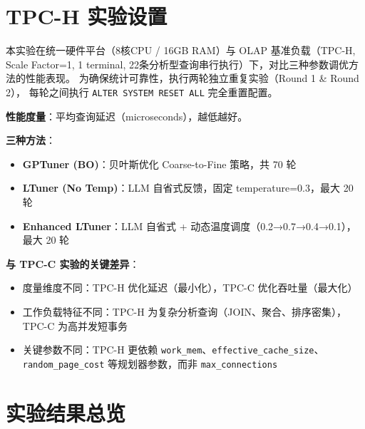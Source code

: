 

\section{TPC-H 实验设置}

本实验在统一硬件平台（8核CPU / 16GB RAM）与 OLAP 基准负载（TPC-H, Scale Factor=1,
1 terminal, 22条分析型查询串行执行）下，对比三种参数调优方法的性能表现。
为确保统计可靠性，执行两轮独立重复实验（Round 1 \& Round 2），
每轮之间执行 \texttt{ALTER SYSTEM RESET ALL} 完全重置配置。

\textbf{性能度量}：平均查询延迟（microseconds），越低越好。

\textbf{三种方法}：
\begin{itemize}
  \item \textbf{GPTuner (BO)}：贝叶斯优化 Coarse-to-Fine 策略，共 70 轮
  \item \textbf{LTuner (No Temp)}：LLM 自省式反馈，固定 temperature=0.3，最大 20 轮
  \item \textbf{Enhanced LTuner}：LLM 自省式 + 动态温度调度（0.2→0.7→0.4→0.1），最大 20 轮
\end{itemize}

\textbf{与 TPC-C 实验的关键差异}：
\begin{itemize}
  \item 度量维度不同：TPC-H 优化延迟（最小化），TPC-C 优化吞吐量（最大化）
  \item 工作负载特征不同：TPC-H 为复杂分析查询（JOIN、聚合、排序密集），
        TPC-C 为高并发短事务
  \item 关键参数不同：TPC-H 更依赖 \texttt{work\_mem}、\texttt{effective\_cache\_size}、
        \texttt{random\_page\_cost} 等规划器参数，而非 \texttt{max\_connections}
\end{itemize}



\section{实验结果总览}

